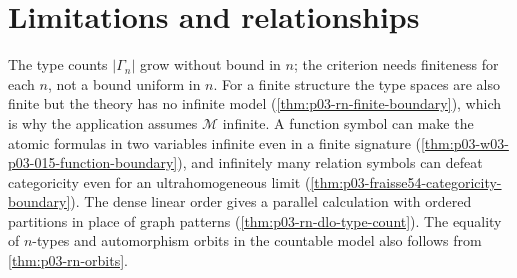 \section{Limitations and relationships}
\label{sec:p03-w03-p03-015-limits}

The type counts \(|\Gamma_n|\) grow without bound in \(n\); the criterion
needs finiteness for each \(n\), not a bound uniform in \(n\). For a
finite structure the type spaces are also finite but the theory has no
infinite model (\cref{thm:p03-rn-finite-boundary}), which is why the
application assumes \(\mathcal M\) infinite. A function symbol can make
the atomic formulas in two variables infinite even in a finite signature
(\cref{thm:p03-w03-p03-015-function-boundary}), and infinitely many
relation symbols can defeat categoricity even for an ultrahomogeneous
limit (\cref{thm:p03-fraisse54-categoricity-boundary}). The dense linear
order gives a parallel calculation with ordered partitions in place of
graph patterns (\cref{thm:p03-rn-dlo-type-count}). The equality of
\(n\)-types and automorphism orbits in the countable model also follows
from \cref{thm:p03-rn-orbits}.
